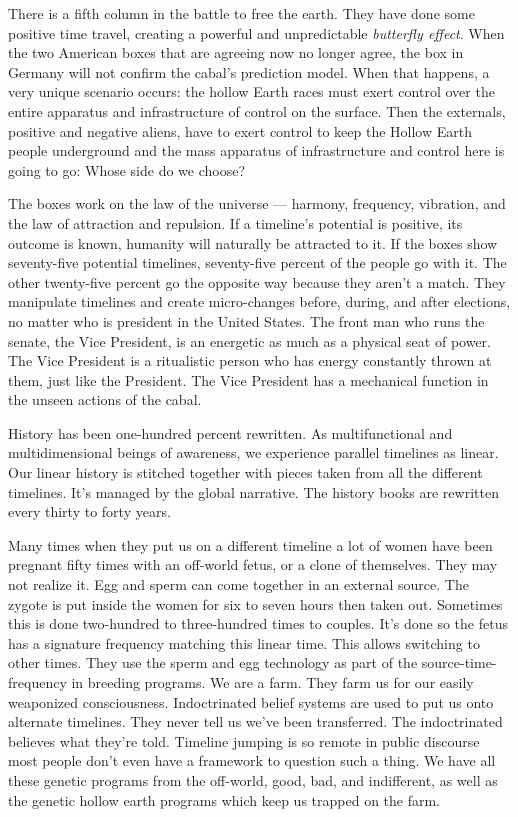 There is a fifth column in the battle to free the earth. They have done
some positive time travel, creating a powerful and unpredictable
\emph{butterfly effect}. When the two American boxes that are agreeing
now no longer agree, the box in Germany will not confirm the cabal's
prediction model. When that happens, a very unique scenario occurs: the
hollow Earth races must exert control over the entire apparatus and
infrastructure of control on the surface. Then the externals, positive
and negative aliens, have to exert control to keep the Hollow Earth
people underground and the mass apparatus of infrastructure and control
here is going to go: Whose side do we choose?

The boxes work on the law of the universe --- harmony, frequency,
vibration, and the law of attraction and repulsion. If a timeline's
potential is positive, its outcome is known, humanity will naturally be
attracted to it. If the boxes show seventy-five potential timelines,
seventy-five percent of the people go with it. The other twenty-five
percent go the opposite way because they aren't a match. They manipulate
timelines and create micro-changes before, during, and after elections,
no matter who is president in the United States. The front man who runs
the senate, the Vice President, is an energetic as much as a physical
seat of power. The Vice President is a ritualistic person who has energy
constantly thrown at them, just like the President. The Vice President
has a mechanical function in the unseen actions of the cabal.

History has been one-hundred percent rewritten. As multifunctional and
multidimensional beings of awareness, we experience parallel timelines
as linear. Our linear history is stitched together with pieces taken
from all the different timelines. It's managed by the global narrative.
The history books are rewritten every thirty to forty years.

Many times when they put us on a different timeline a lot of women have
been pregnant fifty times with an off-world fetus, or a clone of
themselves. They may not realize it. Egg and sperm can come together in
an external source. The zygote is put inside the women for six to seven
hours then taken out. Sometimes this is done two-hundred to
three-hundred times to couples. It's done so the fetus has a signature
frequency matching this linear time. This allows switching to other
times. They use the sperm and egg technology as part of the
source-time-frequency in breeding programs. We are a farm. They farm us
for our easily weaponized consciousness. Indoctrinated belief systems
are used to put us onto alternate timelines. They never tell us we've
been transferred. The indoctrinated believes what they're told. Timeline
jumping is so remote in public discourse most people don't even have a
framework to question such a thing. We have all these genetic programs
from the off-world, good, bad, and indifferent, as well as the genetic
hollow earth programs which keep us trapped on the farm.
